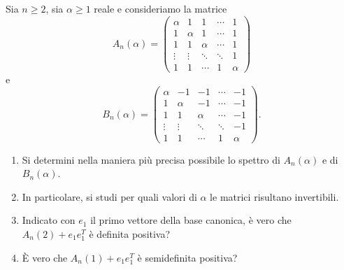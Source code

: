 \documentclass[a4paper]{article}
\begin{document}
\begin{snippetexercise}{}
    Sia \(n \geq 2\), sia \(\alpha \geq 1\) reale e consideriamo la matrice
    \[
        A_n(\alpha) =
        \begin{pmatrix}
            \alpha & 1 & 1 & \cdots & 1 \\
            1 & \alpha & 1 & \cdots & 1 \\
            1 & 1 & \alpha & \cdots & 1 \\
            \vdots & \vdots & \ddots & \ddots & 1 \\
            1 & 1 & \cdots & 1 & \alpha
        \end{pmatrix}
    \]
    e
    \[
        B_n(\alpha) =
        \begin{pmatrix}
            \alpha & -1 & -1 & \cdots & -1 \\
            1 & \alpha & -1 & \cdots & -1 \\
            1 & 1 & \alpha & \cdots & -1 \\
            \vdots & \vdots & \ddots & \ddots & -1 \\
            1 & 1 & \cdots & 1 & \alpha
        \end{pmatrix}.
    \]
    \begin{enumerate}
        \item Si determini nella maniera più precisa possibile lo spettro di \(A_n(\alpha)\)
            e di \(B_n(\alpha)\).
        \item In particolare, si studi per quali valori di \(\alpha\)
            le matrici risultano invertibili.
        \item Indicato con \(e_1\) il primo vettore
            della base canonica, è vero che \(A_n(2) + e_1e_1^T\) è definita positiva?
        \item È vero che \(A_n(1) + e_1e_1^T\) è semidefinita positiva?
    \end{enumerate}
\end{snippetexercise}
\end{document}
